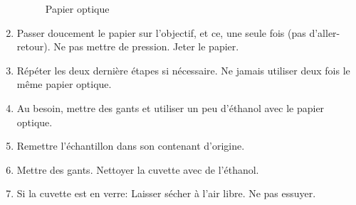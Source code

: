 \begin{enumerate}
\begin{figure}[H]
        \caption{Papier optique}
        \label{fig:papier}
        \end{figure}
    \item Passer doucement le papier sur l'objectif, et ce, une seule fois (pas d'aller-retour). Ne pas mettre de pression. Jeter le papier.
    \item Répéter les deux dernière étapes si nécessaire. Ne jamais utiliser deux fois le même papier optique.
    \item Au besoin, mettre des gants et utiliser un peu d'éthanol avec le papier optique.
    \item Remettre l'échantillon dans son contenant d'origine.
    \item Mettre des gants. Nettoyer la cuvette avec de l'éthanol. \item Si la cuvette est en verre: Laisser sécher à l'air libre. Ne pas essuyer.
\end{enumerate}